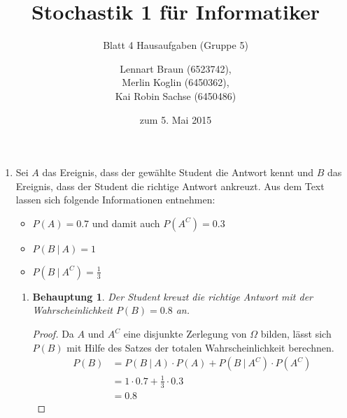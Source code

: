 \documentclass[a4paper]{scrartcl}
\title{Stochastik 1 für Informatiker}
\subtitle{Blatt 4 Hausaufgaben (Gruppe 5)}
\author{
    Lennart Braun (6523742), \\
    Merlin Koglin (6450362), \\
    Kai Robin Sachse (6450486)
}
\date{zum 5. Mai 2015}
\newtheorem*{behaupt}{Behauptung}
\begin{document}
\maketitle

\begin{enumerate}[label=\bfseries\arabic*.]
    \item
        Sei $A$ das Ereignis, dass der gewählte Student die Antwort kennt und
        $B$ das Ereignis, dass der Student die richtige Antwort ankreuzt.
        Aus dem Text lassen sich folgende Informationen entnehmen:
        \begin{itemize}
            \item $P(A) = \num{0.7}$ und damit auch $P(A^C) = \num{0.3}$
            \item $P(B\ |\ A) = 1$
            \item $P(B\ |\ A^C) = \frac{1}{3}$
        \end{itemize}
        \begin{enumerate}[label=(\alph*)]
            \item
                \begin{behaupt}
                    Der Student kreuzt die richtige Antwort mit der
                    Wahrscheinlichkeit $P(B) = \num{0.8}$ an.
                \end{behaupt}
                \begin{proof}
                    Da $A$ und $A^C$ eine disjunkte Zerlegung von $\Omega$
                    bilden, lässt sich $P(B)$ mit Hilfe des Satzes der totalen
                    Wahrscheinlichkeit berechnen.
                    \begin{equation*}
                        \begin{split}
                            P(B) &= P(B\ |\ A) \cdot P(A)
                                    + P(B\ |\ A^C) \cdot P(A^C) \\
                                 &= 1 \cdot \num{0.7}
                                    + \frac{1}{3} \cdot \num{0.3} \\
                                 &= \num{0.8}
                        \end{split}
                    \end{equation*}
                \end{proof}


\end{enumerate}
\end{enumerate}
\end{document}
